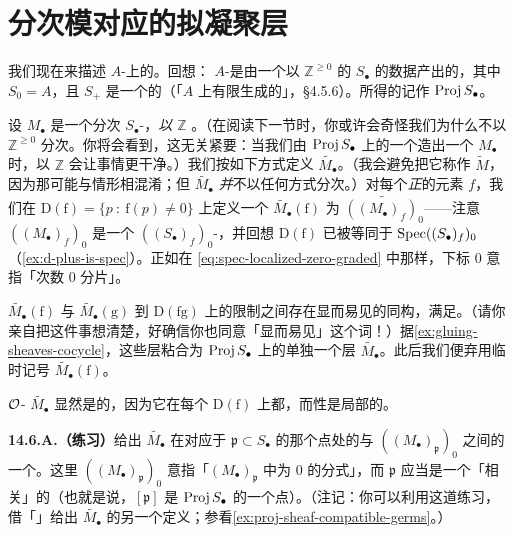 
\section{分次模对应的拟凝聚层}

我们现在来描述\trProjective{} $A$-\trScheme{}上的\trQCSheaf。回想：\trProjective{} $A$-\trScheme{}是由一个以 $\mathbb{Z}^{\ge 0}$ \trGrading{}的\trRing{} $S_\bullet$ 的数据产出的，其中 $S_0=A$，且 $S_+$ 是一个\trFinitelyGenerated{}的\trIdeal（「$A$ 上有限生成的\trGradedRing」，\S4.5.6）。所得的\trScheme{}记作 $\operatorname{Proj} S_\bullet$。

设 $M_\bullet$ 是一个分次 $S_\bullet$-\trModule，\emph{以 $\mathbb{Z}$ \trGrading}。（在阅读下一节时，你或许会奇怪我们为什么不以 $\mathbb{Z}^{\ge 0}$ 分次。你将会看到，这无关紧要：当我们由 $\operatorname{Proj} S_\bullet$ 上的一个\trQCSheaf{}造出一个 $M_\bullet$ 时，以 $\mathbb{Z}$ \trGrading{}会让事情更干净。）我们按如下方式定义\trQCSheaf{} $\widetilde{M_\bullet}$。（我会避免把它称作 $\widetilde{M}$，因为那可能与\trAffine{}情形相混淆；但 $\widetilde{M_\bullet}$ \emph{并}不以任何方式分次。）对每个\emph{正\trDegree{}}的\trHomogeneous{}元素 $f$，我们在\trDistinguishedOpen{} $\mathrm{D}(\mathrm{f})=\{p\ :\ \mathrm{f}(p)\ne 0\}$ 上定义一个\trQCSheaf{} $\widetilde{M_\bullet}(\mathrm{f})$ 为 $\widetilde{((M_\bullet)_f)_0}$——注意 $((M_\bullet)_f)_0$ 是一个 $((S_\bullet)_f)_0$-\trModule，并回想 $\mathrm{D}(\mathrm{f})$ 已被等同于 $\operatorname{Spec}((S_\bullet)_f)_0$（\cref{ex:d-plus-is-spec}）。正如在 \eqref{eq:spec-localized-zero-graded} 中那样，下标 $0$ 意指「次数 $0$ 分片」。

$\widetilde{M_\bullet}(\mathrm{f})$ 与 $\widetilde{M_\bullet}(\mathrm{g})$ 到 $\mathrm{D}(\mathrm{fg})$ 上的限制之间存在显而易见的同构，满足\trCocycleCondition{}。（请你亲自把这件事想清楚，好确信你也同意「显而易见」这个词！）据\cref{ex:gluing-sheaves-cocycle}，这些层粘合为 $\operatorname{Proj} S_\bullet$ 上的单独一个层 $\widetilde{M_\bullet}$。此后我们便弃用临时记号 $\widetilde{M_\bullet}(\mathrm{f})$。

$\mathcal{O}$-\trModule{} $\widetilde{M_\bullet}$ 显然是\trQC{}的，因为它在每个 $\mathrm{D}(\mathrm{f})$ 上都\trQC，而\trQC{}性是局部的。

\textbf{14.6.A.（练习）}\quad 给出 $\widetilde{M_\bullet}$ 在对应于\trHomogeneous\trPrimeIdeal{} $\mathfrak{p}\subset S_\bullet$ 的那个点处的\trStalk{}与 $((M_\bullet)_\mathfrak{p})_0$ 之间的一个\trIsomorphism。这里 $((M_\bullet)_\mathfrak{p})_0$ 意指「$(M_\bullet)_\mathfrak{p}$ 中\trDegree{}为 $0$ 的\trHomogeneous{}分式」，而 $\mathfrak{p}$ 应当是一个「相关」的\trHomogeneous\trPrimeIdeal（也就是说，$[\mathfrak{p}]$ 是 $\operatorname{Proj} S_\bullet$ 的一个点）。（注记：你可以利用这道练习，借「\trCompatible\trStalk」给出 $\widetilde{M_\bullet}$ 的另一个定义；参看\cref{ex:proj-sheaf-compatible-germs}。）

